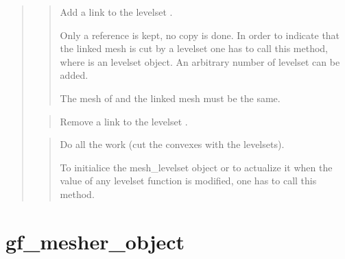 \documentclass[a4paper,11pt,english]{sphinxmanual}
\begin{document}
\sphinxAtStartPar
{}
\begin{quote}

\sphinxAtStartPar
{}
\begin{quote}

\sphinxAtStartPar
Add a link to the levelset .

\sphinxAtStartPar
Only a reference is kept, no copy is done. In order to indicate
that the linked mesh is cut by a levelset one has to call this
method, where  is an levelset object. An arbitrary number of
levelset can be added.

\sphinxAtStartPar
{}

\sphinxAtStartPar
The mesh of  and the linked mesh must be the same.
\end{quote}

\sphinxAtStartPar
{}
\begin{quote}

\sphinxAtStartPar
Remove a link to the levelset .
\end{quote}

\sphinxAtStartPar
{}
\begin{quote}

\sphinxAtStartPar
Do all the work (cut the convexes with the levelsets).

\sphinxAtStartPar
To initialice the mesh\_levelset object or to actualize it when the
value of any levelset function is modified, one has to call
this method.
\end{quote}
\end{quote}


\section{gf\_mesher\_object}
\label{\detokenize{matlab_octave/cmdref_gf_mesher_object:gf-mesher-object}}\label{\detokenize{matlab_octave/cmdref_gf_mesher_object::doc}}
\sphinxAtStartPar
{}
\end{document}
